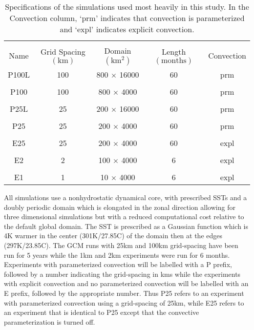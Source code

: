 \documentclass[draft]{agujournal2019}
\begin{document}
\begin{table}
\begin{center}
\caption{Specifications of the simulations used most heavily in this study.  In the Convection
column, `prm'  indicates that convection is parameterized and `expl' indicates explicit convection.}
    \begin{tabular}{*{5}{c}}
    \hline
    \hline
    \\
 Name & Grid Spacing $(\mathrm{km})$ & Domain $ (\mathrm{km^2}) $& Length $(\mathrm{months}) $ & Convection     \\ \hline
  P100L &  100          &   800 $\times$ 16000    &  60              & prm                   \\ 
    \\
  P100 &  100                & 800 $\times$ 4000     & 60            & prm                     \\  
    \\
  P25L &  25             & 200 $\times$ 16000      & 60             & prm                     \\  
    \\
  P25  &  25             & 200 $\times$ 4000      & 60             & prm                   \\  
    \\
 E25  &   25          & 200 $\times$ 4000      & 60             & expl                \\  
    \\
 E2   &   2          & 100 $\times$ 4000      & 6             & expl                   \\ 
    \\
 E1   &   1          & 10 $\times$ 4000      & 6             & expl                 \\  \hline

    \end{tabular}\par
    \label{tab:lambda}
\end{center}
\end{table}


All simulations use a nonhydrostatic dynamical core, with prescribed SSTs and a doubly periodic domain which is elongated in the zonal 
direction allowing for three dimensional simulations but with a reduced computational cost relative to the default global domain.  
The SST is prescribed as a Gaussian function which is 4K warmer in the center (301K/27.85C) of the domain then 
at the edges (297K/23.85C).  The GCM runs with 25km and 100km grid-spacing have been run for 5 years while the 
1km and 2km experiments were run for 6 months.  Experiments with parameterized convection will be labelled with a P prefix, followed
by a number indicating the grid-spacing in kms while the experiments with explicit convection and no parameterized convection will be 
labelled with an E prefix, followed by the appropriate number.  Thus P25 refers to an experiment with parameterized convection using a 
grid-spacing of 25km, while E25 refers to an experiment that is identical to P25 except that the convective parameterization is turned off.    
\end{document}
